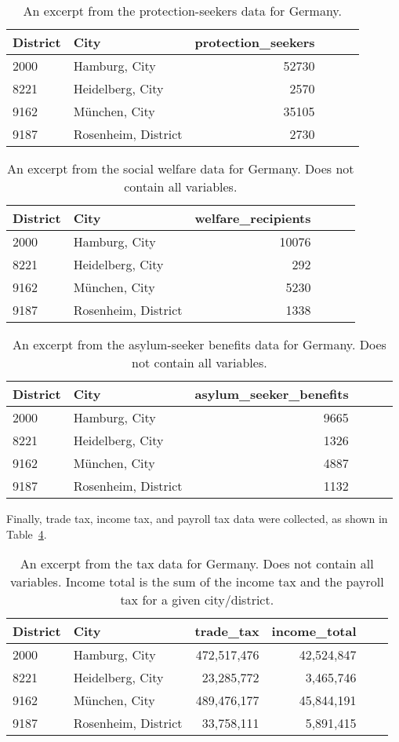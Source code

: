 \begin{table}[H] 
\caption{An excerpt from the protection-seekers data for Germany.\label{protectionGermany}}
\begin{tabular}{l l r r r r}
\toprule
\textbf{District}	& \textbf{City}	& \textbf{protection\_seekers}\\
\midrule
2000 & Hamburg, City & 52730\\
8221 & Heidelberg, City & 2570\\
9162 & München, City &  35105\\
9187 & Rosenheim, District & 2730\\
\bottomrule
\end{tabular}
\end{table}
\begin{table}[H] 
\caption{An excerpt from the social welfare data for Germany. Does not contain all variables.\label{welfareGermany}}
\begin{tabular}{l l r r r r}
\toprule
\textbf{District}	& \textbf{City}	& \textbf{welfare\_recipients}\\
\midrule
2000 & Hamburg, City & 10076\\
8221 & Heidelberg, City & 292\\
9162 & München, City &  5230\\
9187 & Rosenheim, District & 1338\\
\bottomrule
\end{tabular}
\end{table}
\begin{table}[H] 
\caption{An excerpt from the asylum-seeker benefits data for Germany. Does not contain all variables.\label{asylumGermany}}
\begin{tabular}{l l r r r r}
\toprule
\textbf{District}	& \textbf{City}	& \textbf{asylum\_seeker\_benefits}\\
\midrule
2000 & Hamburg, City & 9665\\
8221 & Heidelberg, City & 1326\\
9162 & München, City &  4887\\
9187 & Rosenheim, District & 1132\\
\bottomrule
\end{tabular}
\end{table}
Finally, trade tax, income tax, and payroll tax data were collected, as shown in Table~\ref{taxGermany}.
\begin{table}[H] 
\caption{An excerpt from the tax data for Germany. Does not contain all variables. Income total is the sum of the income tax and the payroll tax for a given city/district.\label{taxGermany}}
\begin{tabular}{l l r r r r}
\toprule
\textbf{District}	& \textbf{City}	& \textbf{trade\_tax}& \textbf{income\_total}\\
\midrule
2000 & Hamburg, City & 472,517,476 & 42,524,847\\
8221 & Heidelberg, City & 23,285,772 & 3,465,746\\
9162 & München, City &  489,476,177 & 45,844,191 \\
9187 & Rosenheim, District & 33,758,111 & 5,891,415 \\
\bottomrule
\end{tabular}
\end{table}
\clearpage

